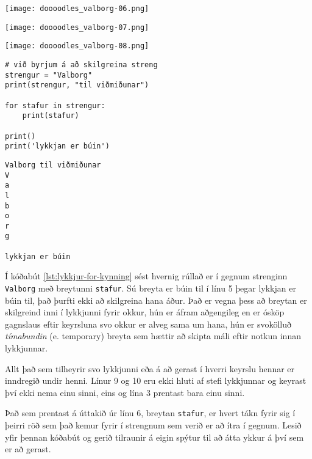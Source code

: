 \vspace{3cm}
\begin{minipage}[b]{0.33\linewidth}
	\centering
	\texttt{[image: doooodles\_valborg-06.png]} 
	\vspace{4ex}
\end{minipage}%
\begin{minipage}[b]{0.33\linewidth}
	\centering
	\texttt{[image: doooodles\_valborg-07.png]} 
	\vspace{4ex}
\end{minipage} 
\begin{minipage}[b]{0.33\linewidth}
	\centering
	\texttt{[image: doooodles\_valborg-08.png]} 
	\vspace{4ex}
\end{minipage}%
\vspace{3cm}

\begin{lstlisting}[caption=For-lykkjur kynntar, label=lst:lykkjur-for-kynning]
# við byrjum á að skilgreina streng
strengur = "Valborg"
print(strengur, "til viðmiðunar")

for stafur in strengur:
	print(stafur)
	
print()
print('lykkjan er búin')
\end{lstlisting}
\lstset{style=uttak}
\begin{lstlisting}
Valborg til viðmiðunar
V
a
l
b
o
r
g

lykkjan er búin
\end{lstlisting}

Í kóðabút \ref{lst:lykkjur-for-kynning} sést hvernig rúllað er í gegnum strenginn \texttt{Valborg} með breytunni \texttt{stafur}.
Sú breyta er búin til í línu 5 þegar lykkjan er búin til, það þurfti ekki að skilgreina hana áður.
Það er vegna þess að breytan er skilgreind inni í lykkjunni fyrir okkur, hún er áfram aðgengileg en er ósköp gagnslaus eftir keyrsluna svo okkur er alveg sama um hana, hún er svokölluð \emph{tímabundin} (e. temporary) breyta sem hættir að skipta máli eftir notkun innan lykkjunnar.

Allt það sem tilheyrir svo lykkjunni eða á að gerast í hverri keyrslu hennar er inndregið undir henni.
Línur 9 og 10 eru ekki hluti af stefi lykkjunnar og keyrast því ekki nema einu sinni, eins og lína 3 prentast bara einu sinni.

Það sem prentast á úttakið úr línu 6, breytan \texttt{stafur}, er hvert tákn fyrir sig í þeirri röð sem það kemur fyrir í strengnum sem verið er að ítra í gegnum.
Lesið yfir þennan kóðabút og gerið tilraunir á eigin spýtur til að átta ykkur á því sem er að gerast.

